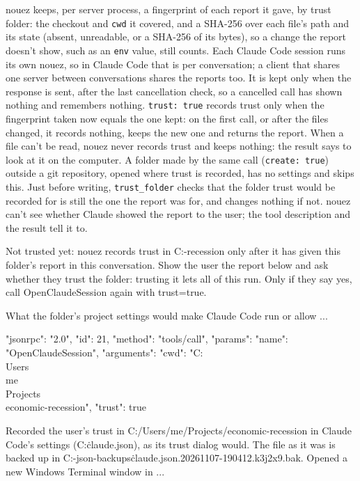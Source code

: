 \documentclass[10pt,a4paper]{article}
\newcommand{\code}[1]{\texttt{#1}}
\begin{document}
nouez keeps, per server process, a fingerprint of each report it gave, by trust folder: the
checkout and \code{cwd} it covered, and a SHA-256 over each file's path and its state (absent,
unreadable, or a SHA-256 of its bytes), so a change the report doesn't show, such as an
\code{env} value, still counts. Each Claude Code session runs its own nouez, so in Claude Code that is per
conversation; a client that shares one server between conversations shares the reports too. It is kept only when the response is sent, after the last cancellation check, so a
cancelled call has shown nothing and remembers nothing. \code{trust: true} records trust only when the fingerprint
taken now equals the one kept: on the first call, or after the files changed, it records nothing,
keeps the new one and returns the report. When a file can't be read, nouez never records trust
and keeps nothing: the result says to look at it on the computer. A folder made by the same call
(\code{create: true}) outside a git repository, opened where trust is recorded, has no settings
and skips this. Just before writing, \code{trust\_folder} checks that the folder trust would be
recorded for is still the one the report was for, and changes nothing if not. nouez can't see
whether Claude showed the report to the user; the tool description and the result tell it to.
\begin{plain}
Not trusted yet: nouez records trust in C:\Users\me\Projects\economic-recession only after it has given this folder's report in this conversation. Show the user the report below and ask whether they trust the folder: trusting it lets all of this run. Only if they say yes, call OpenClaudeSession again with trust=true.

What the folder's project settings would make Claude Code run or allow ...
\end{plain}
\begin{wire}
{"jsonrpc": "2.0", "id": 21, "method": "tools/call", "params": {"name": "OpenClaudeSession", "arguments": {"cwd": "C:\\Users\\me\\Projects\\economic-recession", "trust": true}}}
\end{wire}
\begin{plain}
Recorded the user's trust in C:/Users/me/Projects/economic-recession in Claude Code's settings (C:\Users\me\.claude.json), as its trust dialog would. The file as it was is backed up in C:\Users\me\AppData\Local\nouez\claude-json-backups\.claude.json.20261107-190412.k3j2x9.bak. Opened a new Windows Terminal window in ...
\end{plain}
\end{document}
